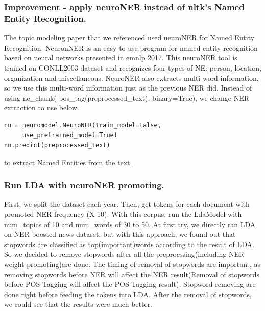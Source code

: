 \subsubsection{Improvement - apply neuroNER instead of nltk's Named Entity Recognition.} 
The topic modeling paper that we referenced used neuroNER for Named Entity Recognition. NeuronNER is an easy-to-use program for named entity recognition based on neural networks presented in emnlp 2017. \cite{2017neuroner} This neuroNER tool is trained on CONLL2003 dataset and recognizes four types of NE: person, location, organization and miscellaneous. NeuroNER also extracts multi-word information, so we use this multi-word information just as the previous NER did. Instead of using ne\_chunk(
pos\_tag(preprocessed\_text), binary=True), we change NER extraction to use below.

\begin{verbatim}
nn = neuromodel.NeuroNER(train_model=False, 
     use_pretrained_model=True)
nn.predict(preprocessed_text)
\end{verbatim}
to extract Named Entities from the text.

\subsubsection{Run LDA with neuroNER promoting.}
First, we split the dataset each year. Then, get tokens for each document with promoted NER frequency (X 10). With this corpus, run the LdaModel with num\_topics of 10 and num\_words of 30 to 50. At first try, we directly ran LDA on NER boosted news dataset. but with this approach, we found out that stopwords are classified as top(important)words according to the result of LDA. So we decided to remove stopwords after all the preprocssing(including NER weight promoting)are done. The timing of removal of stopwords are important, as removing stopwords before NER will affect the NER result(Removal of stopwords before POS Tagging will affect the POS Tagging result). Stopword removing are done right before feeding the tokens into LDA. After the removal of stopwords, we could see that the results were much better.

